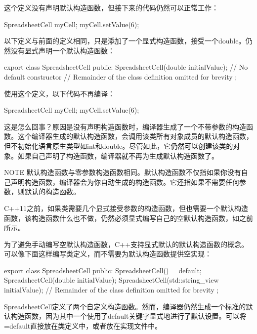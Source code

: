 这个定义没有声明默认构造函数，但接下来的代码仍然可以正常工作：

\begin{cpp}
SpreadsheetCell myCell;
myCell.setValue(6);
\end{cpp}

以下定义与前面的定义相同，只是添加了一个显式构造函数，接受一个double。仍然没有显式声明一个默认构造函数：

\begin{cpp}
export class SpreadsheetCell
{
    public:
        SpreadsheetCell(double initialValue); // No default constructor
        // Remainder of the class definition omitted for brevity
};
\end{cpp}

使用这个定义，以下代码不再编译：

\begin{cpp}
SpreadsheetCell myCell;
myCell.setValue(6);
\end{cpp}

这是怎么回事？原因是没有声明构造函数时，编译器生成了一个不带参数的构造函数。这个编译器生成的默认构造函数，会调用该类所有对象成员的默认构造函数，但不初始化语言原生类型如int和double。尽管如此，它仍然可以创建该类的对象。如果自己声明了构造函数，编译器就不再为生成默认构造函数了。

\begin{myNotic}{NOTE}
默认构造函数与零参数构造函数相同。默认构造函数不仅指如果你没有自己声明构造函数，编译器会为你自动生成的构造函数。它还指如果不需要任何参数，则默认的构造函数。
\end{myNotic}


C++11之前，如果类需要几个显式接受参数的构造函数，但也需要一个默认构造函数，该构造函数什么也不做，仍然必须显式编写自己的空默认构造函数，如之前所示。

为了避免手动编写空默认构造函数，C++支持显式默认的默认构造函数的概念。可以像下面这样编写类定义，而不需要为默认构造函数提供空实现：

\begin{cpp}
export class SpreadsheetCell
{
    public:
        SpreadsheetCell() = default;
        SpreadsheetCell(double initialValue);
        SpreadsheetCell(std::string_view initialValue);
        // Remainder of the class definition omitted for brevity
};
\end{cpp}

SpreadsheetCell定义了两个自定义构造函数。然而，编译器仍然生成一个标准的默认构造函数，因为其中一个使用了default关键字显式地进行了默认设置。可以将=default直接放在类定义中，或者放在实现文件中。

